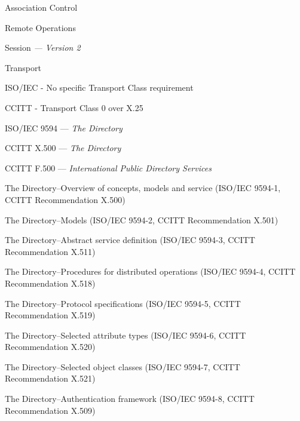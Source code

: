 \begin{bwslide}

\begin{nrtc}
\item	Association Control
\item	Remote Operations
\item	Session {\em --- Version 2}
\item	Transport
\end{nrtc}
\end{bwslide}

\begin{bwslide}

\begin{nrtc}
\item	ISO/IEC - No specific Transport Class requirement
\item	CCITT	- Transport Class 0 over X.25
\end{nrtc}
\end{bwslide}

\begin{bwslide}
\end{bwslide}

\begin{bwslide}

\begin{nrtc}
\item	ISO/IEC 9594 --- {\em The Directory}
\item	CCITT X.500 --- {\em The Directory}
\item	CCITT F.500 --- {\em International Public Directory Services}
\end{nrtc}
\end{bwslide}

\begin{bwslide}

\begin{nrtc}
\item {The Directory--Overview of concepts, models and service}  (ISO/IEC 9594-1, CCITT Recommendation X.500)
\item {The Directory--Models} (ISO/IEC 9594-2, CCITT Recommendation X.501)
\item {The Directory--Abstract service definition} (ISO/IEC 9594-3, CCITT Recommendation X.511)
\item {The Directory--Procedures for distributed operations} (ISO/IEC 9594-4, CCITT Recommendation X.518)
\item {The Directory--Protocol specifications} (ISO/IEC 9594-5, CCITT Recommendation X.519)
\item {The Directory--Selected attribute types} (ISO/IEC 9594-6, CCITT Recommendation X.520)
\item {The Directory--Selected object classes} (ISO/IEC 9594-7, CCITT Recommendation X.521)
\item {The Directory--Authentication framework} (ISO/IEC 9594-8, CCITT Recommendation X.509)
\end{nrtc}
\end{bwslide}

